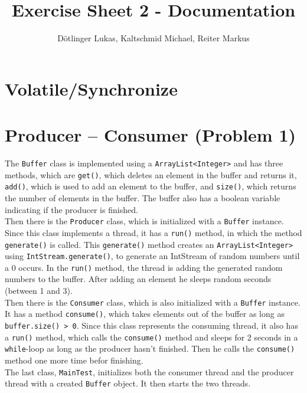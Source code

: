 \documentclass{article}
\begin{document}
	\title{Exercise Sheet 2 - Documentation}
	\date{}
	\author{Dötlinger Lukas, Kaltschmid Michael, Reiter Markus}

	\maketitle

	\section{Volatile/Synchronize}

  \section{Producer – Consumer (Problem 1)}
  
  The \texttt{Buffer} class is implemented using a \texttt{ArrayList<Integer>} and has three methods, which are \texttt{get()}, which deletes an element in the buffer and returns it, \texttt{add()}, which is used to add an element to the buffer, and \texttt{size()}, which returns the number of elements in the buffer. The buffer also has a boolean variable indicating if the producer is finished.\\
  Then there is the \texttt{Producer} class, which is initialized with a \texttt{Buffer} instance. Since this class implements a thread, it has a \texttt{run()} method, in which the method \texttt{generate()} is called. This \texttt{generate()} method creates an \texttt{ArrayList<Integer>} using \texttt{IntStream.generate()}, to generate an IntStream of random numbers until a 0 occurs. In the \texttt{run()} method, the thread is adding the generated random numbers to the buffer. After adding an element he sleeps random seconds (between 1 and 3).\\
  Then there is the \texttt{Consumer} class, which is also initialized with a \texttt{Buffer} instance. It has a method \texttt{consume()}, which takes elements out of the buffer as long as \texttt{buffer.size() > 0}. Since this class represents the consuming thread, it also has a \texttt{run()} method, which calls the \texttt{consume()} method and sleeps for 2 seconds in a \texttt{while}-loop as long as the producer hasn't finished. Then he calls the \texttt{consume()} method one more time befor finishing.\\
  The last class, \texttt{MainTest}, initializes both the consumer thread and the producer thread with a created \texttt{Buffer} object. It then starts the two threads.\\
\end{document}

